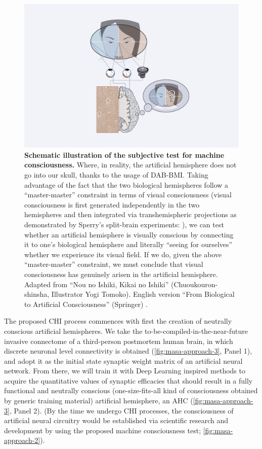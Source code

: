 \documentclass[10pt]{article}
\begin{document}
\begin{sloppypar}
  \begin{figure}[ht!]
    \centering
    \includegraphics[width=\textwidth]{figures/masa-approach-2.png}
    \caption[CHI: Schematic illustration of the subjective test for machine consciousness]{\textbf{Schematic illustration of the subjective test for machine consciousness.} Where, in reality, the artificial hemisphere does not go into our skull, thanks to the usage of DAB-BMI. Taking advantage of the fact that the two biological hemispheres follow a “master-master” constraint in terms of visual consciousness (visual consciousness is first generated independently in the two hemispheres and then integrated via transhemispheric projections as demonstrated by Sperry’s split-brain experiments: \cite{gazzaniga_functional_1962}), we can test whether an artificial hemisphere is visually conscious by connecting it to one’s biological hemisphere and literally “seeing for ourselves” whether we experience its visual field. If we do, given the above “master-master” constraint, we must conclude that visual consciousness has genuinely arisen in the artificial hemisphere. Adapted from “Nou no Ishiki, Kikai no Ishiki” (Chuoukouron-shinsha, Illustrator Yogi Tomoko). English version “From Biological to Artificial Consciousness” (Springer) \citep{watanabe_biological_2022}.}
    \label{fig:masa-approach-2}
  \end{figure}

  The proposed CHI process commences with first the creation of neutrally conscious artificial hemispheres. We take the to-be-compiled-in-the-near-future invasive connectome of a third-person postmortem human brain, in which discrete neuronal level connectivity is obtained (\autoref{fig:masa-approach-3}, Panel 1), and adopt it as the initial state synaptic weight matrix of an artificial neural network. From there, we will train it with Deep Learning inspired methods to acquire the quantitative values of synaptic efficacies that should result in a fully functional and neutrally conscious (one-size-fits-all kind of consciousness obtained by generic training material) artificial hemisphere, an AHC (\autoref{fig:masa-approach-3}, Panel 2). (By the time we undergo CHI processes, the consciousness of artificial neural circuitry would be established via scientific research and development by using the proposed machine consciousness test; \autoref{fig:masa-approach-2}).


\end{sloppypar}
\end{document}

